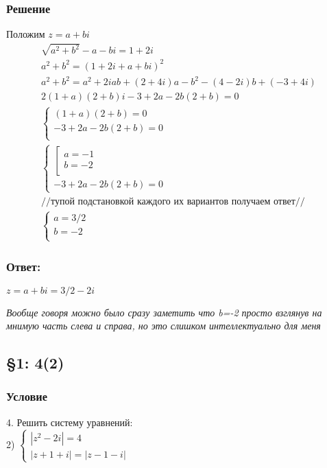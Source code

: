 \documentclass{article}
\begin{document}
\subsubsection*{Решение}
Положим $z=a + b i$
\begin{gather*}
    \sqrt{a^2 + b^2} - a - b i = 1 + 2i \\
    a^2 + b^2 = (1+ 2 i +a + b i )^2\\
    a^2+b^2 = a^2+2 i a b+(2+4 i) a-b^2-(4-2 i) b+(-3+4 i)\\
    2 (1 + a) (2 + b) i -3 + 2 a - 2 b (2 + b) = 0\\
    \begin{cases}
       (1+a)(2+b)=0\\
       -3 + 2 a - 2 b (2 + b) = 0\\
    \end{cases}\\
    \begin{cases}
      \left[
        \begin{gathered}
            a=-1\\
            b=-2\\
        \end{gathered}
        \right. \\
       -3 + 2 a - 2 b (2 + b) = 0
    \end{cases}\\
    \text{//тупой подстановкой каждого их вариантов получаем ответ//}\\
    \begin{cases}
        a=3/2\\
        b=-2\\
    \end{cases}
\end{gather*}
\subsubsection*{Ответ:}
$z=a+bi = 3/2 -2 i$

 \textcolor[rgb]{0.480469,0.566406,0.480469}{\textit{Вообще говоря можно было сразу заметить что b=-2 просто взглянув на мнимую часть слева и справа, но это слишком интеллектуально для меня}}                                               

\subsection{\S1: 4(2)}
\subsubsection*{Условие}
4. Решить систему уравнений:\\
2) $\left\{\begin{array}{l}\left|z^{2}-2 i\right|=4 \\ |z+1+i|=|z-1-i|\end{array}\right.$
\end{document}

